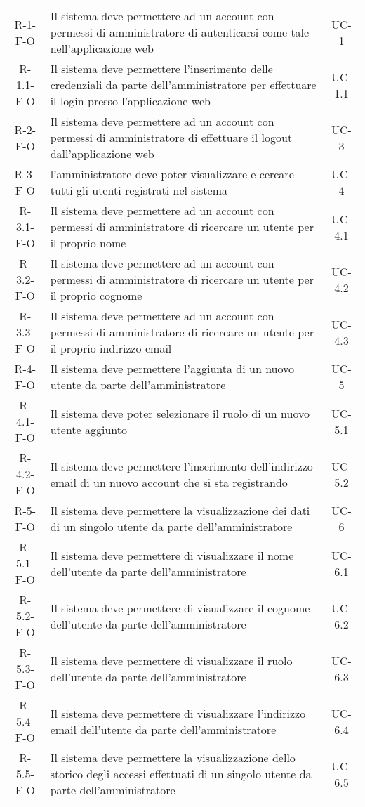 \begin{longtable}{ c C{9cm} c }
    R-1-F-O & Il sistema deve permettere ad un account con permessi di amministratore di autenticarsi come tale nell'applicazione web& UC-1 \\
    R-1.1-F-O & Il sistema deve permettere l'inserimento delle credenziali da parte dell'amministratore per effettuare il login presso l'applicazione web& UC-1.1 \\
    R-2-F-O & Il sistema deve permettere ad un account con permessi di amministratore di effettuare il logout dall'applicazione web& UC-3 \\
    R-3-F-O & l'amministratore deve poter visualizzare e cercare tutti gli utenti registrati nel sistema& UC-4 \\
    R-3.1-F-O & Il sistema deve permettere ad un account con permessi di amministratore di ricercare un utente per il proprio nome& UC-4.1 \\
    R-3.2-F-O & Il sistema deve permettere ad un account con permessi di amministratore di ricercare un utente per il proprio cognome& UC-4.2 \\
    R-3.3-F-O & Il sistema deve permettere ad un account con permessi di amministratore di ricercare un utente per il proprio indirizzo email& UC-4.3 \\
    R-4-F-O & Il sistema deve permettere l'aggiunta di un nuovo utente da parte dell'amministratore& UC-5 \\
    R-4.1-F-O & Il sistema deve poter selezionare il ruolo di un nuovo utente aggiunto& UC-5.1 \\
    R-4.2-F-O & Il sistema deve permettere l'inserimento dell'indirizzo email di un nuovo account che si sta registrando& UC-5.2 \\
    R-5-F-O & Il sistema deve permettere la visualizzazione dei dati di un singolo utente da parte dell'amministratore& UC-6 \\
    R-5.1-F-O & Il sistema deve permettere di visualizzare il nome dell'utente da parte dell'amministratore& UC-6.1 \\
    R-5.2-F-O & Il sistema deve permettere di visualizzare il cognome dell'utente da parte dell'amministratore& UC-6.2 \\
    R-5.3-F-O & Il sistema deve permettere di visualizzare il ruolo dell'utente da parte dell'amministratore& UC-6.3 \\
    R-5.4-F-O & Il sistema deve permettere di visualizzare l'indirizzo email dell'utente da parte dell'amministratore& UC-6.4 \\
    R-5.5-F-O & Il sistema deve permettere la visualizzazione dello storico degli accessi effettuati di un singolo utente da parte dell'amministratore& UC-6.5 \\

\end{longtable}
